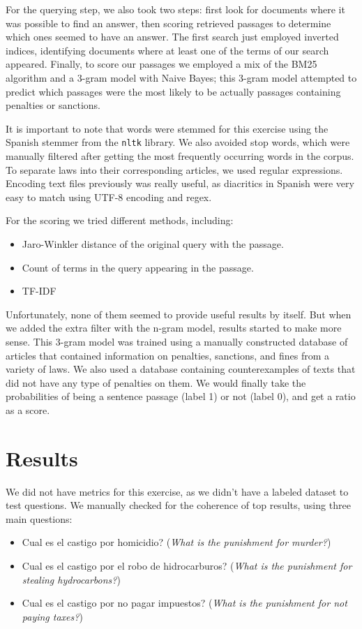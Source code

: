 \documentclass[letterpaper, margin=1in]{article}
\begin{document}
For the querying step, we also took two steps: first look for documents where it was possible to find an answer, then scoring retrieved passages to determine which ones seemed to have an answer. The first search just employed inverted indices, identifying documents where at least one of the terms of our search appeared. Finally, to score our passages we employed a mix of the BM25 algorithm and a 3-gram model with Naive Bayes; this 3-gram model attempted to predict which passages were the most likely to be actually passages containing penalties or sanctions.

It is important to note that words were stemmed for this exercise using the Spanish stemmer from the  \texttt{nltk} library. We also avoided stop words, which were manually filtered after getting the most frequently occurring words in the corpus. To separate laws into their corresponding articles, we used regular expressions. Encoding text files previously was really useful, as diacritics in Spanish were very easy to match using UTF-8 encoding and regex. 

For the scoring we tried different methods, including:

\begin{itemize}
\item Jaro-Winkler distance of the original query with the passage.
\item Count of terms in the query appearing in the passage.
\item TF-IDF
\end{itemize}

Unfortunately, none of them seemed to provide useful results by itself. But when we added the extra filter with the n-gram model, results started to make more sense. This 3-gram model was trained using a manually constructed database of articles that contained information on penalties, sanctions, and fines from a variety of laws. We also used a database containing counterexamples of texts that did not have any type of penalties on them. We would finally take the probabilities of being a sentence passage (label 1) or not (label 0), and get a ratio as a score. 

\section{Results}
We did not have metrics for this exercise, as we didn't have a labeled dataset to test questions. We manually checked for the coherence of top results, using three main questions:
\begin{itemize}
\item Cual es el castigo por homicidio? (\textit{What is the punishment for murder?})
\item Cual es el castigo por el robo de hidrocarburos? (\textit{What is the punishment for stealing hydrocarbons?})
\item Cual es el castigo por no pagar impuestos? (\textit{What is the punishment for not paying taxes?})
\end{itemize}
\end{document}
